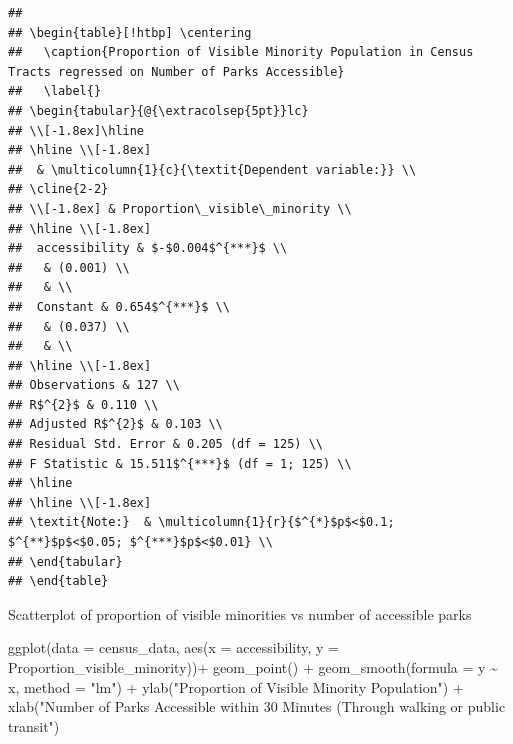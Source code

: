 \documentclass[
]{article}
\newenvironment{Shaded}{\begin{snugshade}}{\end{snugshade}}
\newcommand{\AttributeTok}[1]{\textcolor[rgb]{0.77,0.63,0.00}{#1}}
\newcommand{\FunctionTok}[1]{\textcolor[rgb]{0.00,0.00,0.00}{#1}}
\newcommand{\NormalTok}[1]{#1}
\newcommand{\SpecialCharTok}[1]{\textcolor[rgb]{0.00,0.00,0.00}{#1}}
\newcommand{\StringTok}[1]{\textcolor[rgb]{0.31,0.60,0.02}{#1}}
\begin{document}
\begin{verbatim}
## 
## \begin{table}[!htbp] \centering 
##   \caption{Proportion of Visible Minority Population in Census Tracts regressed on Number of Parks Accessible} 
##   \label{} 
## \begin{tabular}{@{\extracolsep{5pt}}lc} 
## \\[-1.8ex]\hline 
## \hline \\[-1.8ex] 
##  & \multicolumn{1}{c}{\textit{Dependent variable:}} \\ 
## \cline{2-2} 
## \\[-1.8ex] & Proportion\_visible\_minority \\ 
## \hline \\[-1.8ex] 
##  accessibility & $-$0.004$^{***}$ \\ 
##   & (0.001) \\ 
##   & \\ 
##  Constant & 0.654$^{***}$ \\ 
##   & (0.037) \\ 
##   & \\ 
## \hline \\[-1.8ex] 
## Observations & 127 \\ 
## R$^{2}$ & 0.110 \\ 
## Adjusted R$^{2}$ & 0.103 \\ 
## Residual Std. Error & 0.205 (df = 125) \\ 
## F Statistic & 15.511$^{***}$ (df = 1; 125) \\ 
## \hline 
## \hline \\[-1.8ex] 
## \textit{Note:}  & \multicolumn{1}{r}{$^{*}$p$<$0.1; $^{**}$p$<$0.05; $^{***}$p$<$0.01} \\ 
## \end{tabular} 
## \end{table}
\end{verbatim}

Scatterplot of proportion of visible minorities vs number of accessible
parks

\begin{Shaded}
\begin{Highlighting}[]
\FunctionTok{ggplot}\NormalTok{(}\AttributeTok{data =}\NormalTok{ census\_data, }
       \FunctionTok{aes}\NormalTok{(}\AttributeTok{x =}\NormalTok{ accessibility, }
           \AttributeTok{y =}\NormalTok{ Proportion\_visible\_minority))}\SpecialCharTok{+}
  \FunctionTok{geom\_point}\NormalTok{() }\SpecialCharTok{+}
  \FunctionTok{geom\_smooth}\NormalTok{(}\AttributeTok{formula =}\NormalTok{ y }\SpecialCharTok{\textasciitilde{}}\NormalTok{ x,}
              \AttributeTok{method =} \StringTok{"lm"}\NormalTok{) }\SpecialCharTok{+}
  \FunctionTok{ylab}\NormalTok{(}\StringTok{"Proportion of Visible Minority Population"}\NormalTok{) }\SpecialCharTok{+}
  \FunctionTok{xlab}\NormalTok{(}\StringTok{"Number of Parks Accessible within 30 Minutes (Through walking or public transit"}\NormalTok{) }
\end{Highlighting}
\end{Shaded}
\end{document}
